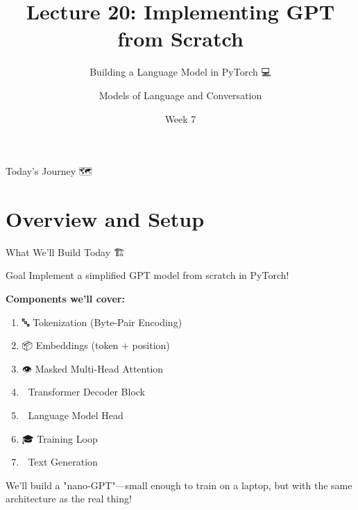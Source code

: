 \documentclass[aspectratio=169]{beamer}
\title{Lecture 20: Implementing GPT from Scratch}
\subtitle{Building a Language Model in PyTorch 💻}
\author{Models of Language and Conversation}
\institute{Dr. Jeremy R. Manning}
\date{Week 7}
\begin{document}
\begin{frame}
    \titlepage
\end{frame}

\begin{frame}{Today's Journey 🗺️}
    \tableofcontents
\end{frame}

\section{Overview and Setup}

\begin{frame}[shrink=10]{What We'll Build Today 🏗️}
\small
    \begin{alertblock}{Goal}
        Implement a simplified GPT model from scratch in PyTorch!
    \end{alertblock}

    \vspace{0.3cm}

    \textbf{Components we'll cover:}
    \begin{enumerate}\setlength{\itemsep}{0pt}
        \item 🔤 Tokenization (Byte-Pair Encoding)
        \item 📦 Embeddings (token + position)
        \item 👁️ Masked Multi-Head Attention
        \item 🧠 Transformer Decoder Block
        \item 🎯 Language Model Head
        \item 🎓 Training Loop
        \item 🎲 Text Generation
    \end{enumerate}

    \vspace{0.3cm}

    \begin{thinkaboutit}
        We'll build a "nano-GPT"—small enough to train on a laptop, but with the same architecture as the real thing!
    \end{thinkaboutit}
\end{frame}
\end{document}
